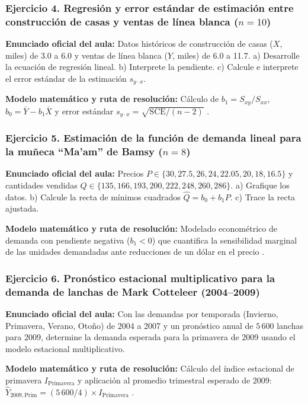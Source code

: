 {\subsubsection*{Ejercicio 4. Regresión y error estándar de estimación entre construcción de casas y ventas de línea blanca ($n=10$)}
\textbf{Enunciado oficial del aula:} Datos históricos de construcción de casas ($X$, miles) de 3.0 a 6.0 y ventas de línea blanca ($Y$, miles) de 6.0 a 11.7. a) Desarrolle la ecuación de regresión lineal. b) Interprete la pendiente. c) Calcule e interprete el error estándar de la estimación $s_{y\cdot x}$.

\textbf{Modelo matemático y ruta de resolución:} Cálculo de $b_1 = S_{xy}/S_{xx}$, $b_0 = \bar{Y} - b_1\bar{X}$ y error estándar $s_{y\cdot x} = \sqrt{\text{SCE}/(n-2)}$ \citep{lind2012}.

\subsubsection*{Ejercicio 5. Estimación de la función de demanda lineal para la muñeca ``Ma'am'' de Bamsy ($n=8$)}
\textbf{Enunciado oficial del aula:} Precios $P \in \{30, 27.5, 26, 24, 22.05, 20, 18, 16.5\}$ y cantidades vendidas $Q \in \{135, 166, 193, 200, 222, 248, 260, 286\}$. a) Grafique los datos. b) Calcule la recta de mínimos cuadrados $\hat{Q} = b_0 + b_1 P$. c) Trace la recta ajustada.

\textbf{Modelo matemático y ruta de resolución:} Modelado econométrico de demanda con pendiente negativa ($b_1 < 0$) que cuantifica la sensibilidad marginal de las unidades demandadas ante reducciones de un dólar en el precio \citep{anderson2012}.

\subsubsection*{Ejercicio 6. Pronóstico estacional multiplicativo para la demanda de lanchas de Mark Cotteleer (2004--2009)}
\textbf{Enunciado oficial del aula:} Con las demandas por temporada (Invierno, Primavera, Verano, Otoño) de 2004 a 2007 y un pronóstico anual de $5\,600$ lanchas para 2009, determine la demanda esperada para la primavera de 2009 usando el modelo estacional multiplicativo.

\textbf{Modelo matemático y ruta de resolución:} Cálculo del índice estacional de primavera $I_{\text{Primavera}}$ y aplicación al promedio trimestral esperado de 2009: $\hat{Y}_{2009,\text{Prim}} = (5\,600 / 4) \times I_{\text{Primavera}}$ \citep{anderson2012,hyndmanForecasting2021}.

}
